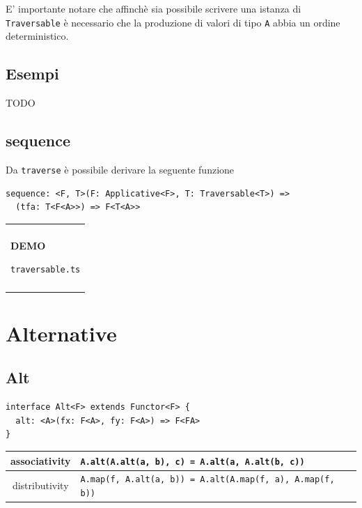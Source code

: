 \documentclass[12pt]{article}
\newenvironment{demo}
    {\begin{center}
    \begin{tabular}{|p{0.9\textwidth}|}
    \hline\\
    }
    {
    \\\\\hline
    \end{tabular}
    \end{center}
    }
\begin{document}
E' importante notare che affinchè sia possibile scrivere una istanza di \texttt{Traversable} è necessario che la produzione di valori
di tipo \texttt{A} abbia un ordine deterministico.

\subsection{Esempi}

TODO

\subsection{sequence}

Da \texttt{traverse} è possibile derivare la seguente funzione

\begin{verbatim}
sequence: <F, T>(F: Applicative<F>, T: Traversable<T>) =>
  (tfa: T<F<A>>) => F<T<A>>
\end{verbatim}

\begin{demo}
\begin{center}
\textbf{DEMO}

\texttt{traversable.ts}
\end{center}
\end{demo}

\newpage

\section{Alternative}

\subsection{Alt}

\begin{verbatim}
interface Alt<F> extends Functor<F> {
  alt: <A>(fx: F<A>, fy: F<A>) => F<FA>
}
\end{verbatim}

\begin{center}
\bgroup
\def\arraystretch{1.5}
\begin{tabular}{ |c|p{10cm}| }
\hline
associativity & \texttt{A.alt(A.alt(a, b), c) = A.alt(a, A.alt(b, c))} \\
\hline
distributivity & \texttt{A.map(f, A.alt(a, b)) = A.alt(A.map(f, a), A.map(f, b))} \\
\hline
\end{tabular}
\egroup
\end{center}
\end{document}

